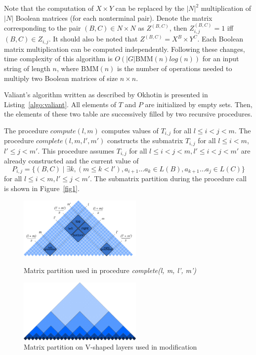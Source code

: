 Note that the computation of $X \times Y$  can be replaced by the $|N|^2$ multiplication of $|N|$ Boolean matrices (for each nonterminal pair).
Denote the matrix corresponding to the pair $(B, C) \in N \times N$ as $Z^{(B, C)}$, then $Z_{i, j}^{(B, C)} = 1$ iff $(B, C) \in Z_{i, j}$.
It should also be noted that $Z^{(B, C)} = X^{B} \times Y^{C}$.
Each Boolean matrix multiplication can be computed independently.
Following these changes, time complexity of this algorithm is $O(|G|\mathrm{BMM}(n)log(n))$ for an input string of length $n$, where $\mathrm{BMM}(n)$ is the number of operations needed to multiply two Boolean matrices of size $n \times n$.

Valiant's algorithm written as described by Okhotin is presented in Listing~\ref{algo:valiant}.
All elements of $T$ and $P$ are initialized by empty sets.
Then, the elements of these two table are successively filled by two recursive procedures.


The procedure $compute(l, m)$ computes values of $T_{i,j}$ for all $l \le i < j < m$.
The procedure $complete(l, m, l', m')$ constructs the submatrix $T_{i, j}$ for all $l \le i < m$, $l' \le j < m'$. This procedure assumes $T_{i, j}$ for all $l \leq i < j < m,  l' \leq i < j < m'$ are already constructed and the current value of  $$P_{i, j} =  \{ (B, C) \mid \exists k, (m \le k < l'), a_{i + 1} \dots a_{k} \in L(B), a_{k + 1} \dots a_{j} \in L(C)\}$$ for all $l \leq i < m,  l' \leq j < m'$.
The submatrix partition during the procedure call is shown in Figure~\ref{fig1}.


\begin{figure}
\vspace{3mm}
 \begin{center}
    \begin{minipage}{0.48\textwidth}
        \centering
        \includegraphics[width=6cm]{pictures/splitting_with_grounded.pdf}
        \caption{Matrix partition used in procedure \textit{complete(l, m, l', m')}}
        \label{fig1}
    \end{minipage}\hfill
    \begin{minipage}{0.48\textwidth}
        \centering
        \includegraphics[width=6cm]{pictures/layers.pdf}
        \caption{Matrix partition on V-shaped layers used in modification}
        \label{fig2}
    \end{minipage}
 \end{center}
\vspace{-8mm}
\end{figure}

